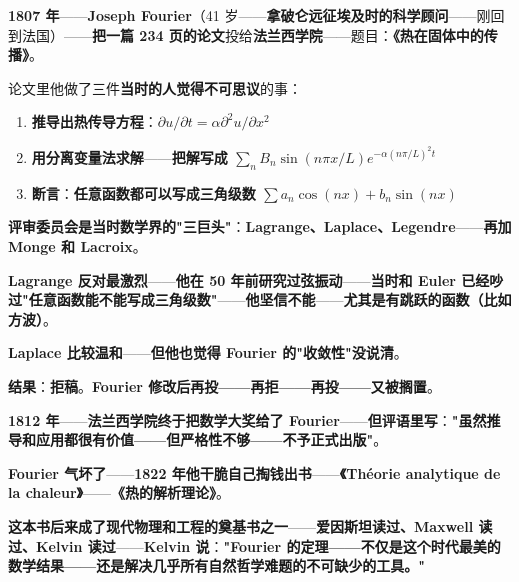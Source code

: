 \begin{tcolorbox}[storybox={\Large 小故事：Fourier 与三次被拒的论文}]
\textbf{1807 年}——\textbf{Joseph Fourier}（41 岁——\textbf{拿破仑远征埃及时的科学顾问}——刚回到法国）——\textbf{把一篇 234 页的论文}投给\textbf{法兰西学院}——题目：\textbf{《热在固体中的传播》}。

\medskip

论文里他做了三件\textbf{当时的人觉得不可思议}的事：

\begin{enumerate}
\item \textbf{推导出热传导方程}：$\partial u / \partial t = \alpha \partial^2 u / \partial x^2$
\item \textbf{用分离变量法求解}——\textbf{把解写成 $\sum_n B_n \sin(n\pi x/L) e^{-\alpha (n\pi/L)^2 t}$}
\item \textbf{断言}：\textbf{\textbf{任意函数都可以写成三角级数 $\sum a_n \cos(nx) + b_n \sin(nx)$}}
\end{enumerate}

\medskip

\textbf{评审委员会是当时数学界的"三巨头"}：\textbf{Lagrange、Laplace、Legendre}——\textbf{再加 Monge 和 Lacroix}。

\medskip

\textbf{Lagrange 反对最激烈}——\textbf{他在 50 年前研究过弦振动}——\textbf{当时和 Euler 已经吵过"任意函数能不能写成三角级数"}——\textbf{他坚信不能}——\textbf{尤其是有跳跃的函数（比如方波）}。

\medskip

\textbf{Laplace 比较温和}——\textbf{但他也觉得 Fourier 的"收敛性"没说清}。

\medskip

\textbf{结果}：\textbf{拒稿}。\textbf{Fourier 修改后再投——再拒——再投——又被搁置}。

\medskip

\textbf{1812 年}——\textbf{法兰西学院终于把数学大奖给了 Fourier}——\textbf{但评语里写}：\textbf{"虽然推导和应用都很有价值——但严格性不够——\textbf{不予正式出版}"}。

\medskip

\textbf{Fourier 气坏了}——\textbf{1822 年他干脆自己掏钱出书}——\textbf{《Théorie analytique de la chaleur》}——\textbf{《热的解析理论》}。

\medskip

\textbf{这本书后来成了现代物理和工程的奠基书之一}——\textbf{爱因斯坦读过、Maxwell 读过、Kelvin 读过}——\textbf{Kelvin 说}：\textbf{"Fourier 的定理——不仅是这个时代最美的数学结果——还是解决几乎所有自然哲学难题的不可缺少的工具。"}


\end{tcolorbox}
